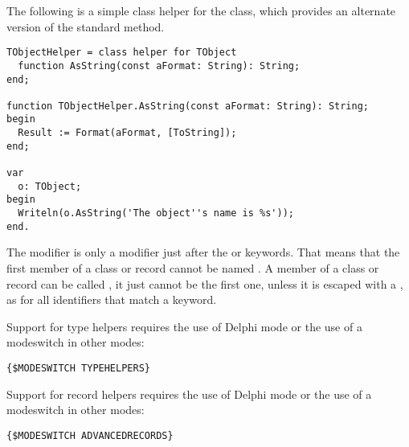The following is a simple class helper for the  class, which provides
an alternate version of the standard  method.
\begin{verbatim}
TObjectHelper = class helper for TObject
  function AsString(const aFormat: String): String; 
end;
 
function TObjectHelper.AsString(const aFormat: String): String;
begin
  Result := Format(aFormat, [ToString]);
end;
 
var
  o: TObject;
begin
  Writeln(o.AsString('The object''s name is %s'));
end.
\end{verbatim}

\begin{remark}
The  modifier is only a modifier just after the  or
 keywords. That means that the first member of a class or record
cannot be named . A member of a class or record can be called
, it just cannot be the first one, unless it is escaped with a
\var{\&}, as for all identifiers that match a keyword.
\end{remark}

\begin{remark}
Support for type helpers requires the use of Delphi mode or the use of a
 modeswitch in other modes:
\begin{verbatim}
{$MODESWITCH TYPEHELPERS}
\end{verbatim}
\end{remark}

\begin{remark}
Support for record helpers requires the use of Delphi mode or the use of a
 modeswitch in other modes:
\begin{verbatim}
{$MODESWITCH ADVANCEDRECORDS}
\end{verbatim}
\end{remark}


